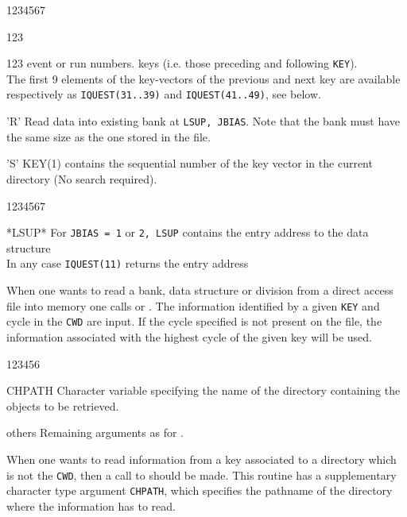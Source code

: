 \begin{DLtt}{1234567}
\begin{DLtt}{123}
\begin{DLtt}{123}
{event or run numbers.}
keys (i.e. those preceding and following {\tt KEY}).\\
The first 9 elements of the key-vectors of the previous and next key are available
respectively as {\tt IQUEST(31..39)} and {\tt IQUEST(41..49)}, see below.
\item['R']Read data into existing bank at {\tt LSUP, JBIAS}. Note that the bank
must have the same size as the one stored in the file.
\item['S']KEY(1) contains the sequential number of the key vector
in the current directory (No search required).
\end{DLtt}
\end{DLtt}
\end{DLtt}
\Odesc
\begin{DLtt}{1234567}
\item[*LSUP*]For {\tt JBIAS = 1} or {\tt 2, LSUP} contains
the entry address to the data structure\\
In any case {\tt IQUEST(11)} returns the entry address
\end{DLtt}

When one wants to read a bank, data structure or division from
a direct access file into memory one calls  or .
The information identified by a given {\tt KEY} and cycle in the {\tt CWD} are
input. If the cycle specified is not present on the file, the information
associated with the highest cycle of the given key will be used.



\begin{DLtt}{123456}
\item[CHPATH] Character variable specifying the name of the
directory containing the objects to be retrieved.
\item[others] Remaining arguments as for .
\end{DLtt}

When one wants to read information from a key associated to a directory
which is not the {\tt CWD}, then a call to  should be made.
This routine has a supplementary character type argument {\tt CHPATH}, which
specifies the pathname
of the directory where the information has to read.

